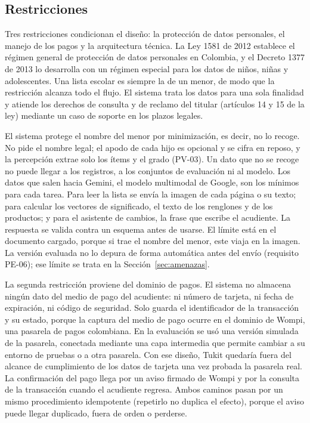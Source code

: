 \subsection{Restricciones}
\label{sec:restricciones}

Tres restricciones condicionan el diseño: la protección de datos personales, el manejo de los pagos y la arquitectura técnica. La Ley 1581 de 2012
\citep{congreso_ley1581_2012} establece el régimen general de protección de datos
personales en Colombia, y el Decreto 1377 de 2013 \citep{presidencia_decreto1377_2013} lo
desarrolla con un régimen especial para los datos de niños, niñas y adolescentes. Una lista
escolar es siempre la de un menor, de modo que la restricción alcanza todo el flujo. El sistema trata los datos para una sola finalidad y atiende los derechos de consulta y de reclamo del titular (artículos 14 y 15 de la ley) mediante un caso de soporte en los plazos legales.

El sistema protege el nombre del menor por minimización, es decir, no lo recoge. No pide el
nombre legal; el apodo de cada hijo es opcional y se cifra en
reposo, y la percepción extrae solo los ítems y el grado (PV-03). Un dato
que no se recoge no puede llegar a los registros, a los conjuntos de evaluación ni al modelo.
\label{sec:datos-gemini}
Los datos que salen hacia Gemini, el modelo multimodal de Google, son los mínimos para cada tarea. Para leer la lista se envía la imagen de cada página o su texto; para calcular los vectores de significado, el texto de los renglones y de los productos; y para el asistente de cambios, la frase que escribe el acudiente. La respuesta se valida contra un esquema antes de usarse. El límite está en el documento cargado, porque si trae el nombre del menor, este viaja en la imagen. La versión evaluada no lo depura de forma automática antes del envío (requisito PE-06); ese límite se trata en la Sección~\ref{sec:amenazas}.

La segunda restricción proviene del dominio de pagos. El sistema no almacena ningún dato del
medio de pago del acudiente: ni número de tarjeta, ni fecha de expiración, ni código de
seguridad. Solo guarda el identificador de la transacción y su estado, porque la captura del
medio de pago ocurre en el dominio de Wompi, una pasarela de pagos colombiana. En la evaluación se usó una versión simulada de la pasarela, conectada mediante una capa intermedia que permite cambiar a su entorno de pruebas o a otra pasarela. Con ese diseño, Tukit quedaría fuera del alcance de cumplimiento de los datos de tarjeta una vez probada la pasarela real. La confirmación
del pago llega por un aviso firmado de Wompi y
por la consulta de la transacción cuando el acudiente regresa. Ambos caminos pasan por un
mismo procedimiento idempotente (repetirlo no duplica el efecto), porque el aviso puede llegar duplicado, fuera de orden o
perderse.

